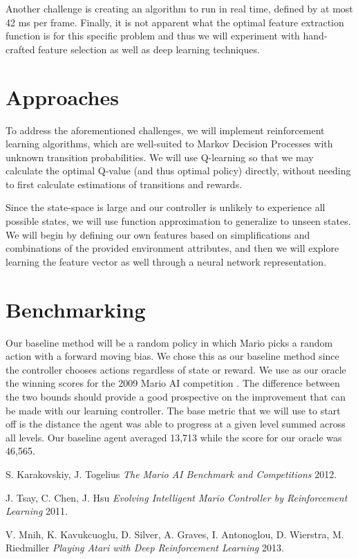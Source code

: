 \documentclass[12pt]{article}
\begin{document}
Another challenge is creating an algorithm to run in real time, defined by at most 42 ms per frame. Finally, it is not apparent what the optimal feature extraction function is for this specific problem and thus we will experiment with hand-crafted feature selection as well as deep learning techniques.

\section{Approaches}

To address the aforementioned challenges, we will implement reinforcement learning algorithms, which are well-suited to Markov Decision Processes with unknown transition probabilities. We will use Q-learning so that we may calculate the optimal Q-value (and thus optimal policy) directly, without needing to first calculate estimations of transitions and rewards. 

Since the state-space is large and our controller is unlikely to experience all possible states, we will use function approximation to generalize to unseen states. We will begin by defining our own features based on simplifications and combinations of the provided environment attributes, and then we will explore learning the feature vector as well through a neural network representation.

\section{Benchmarking}

Our baseline method will be a random policy in which Mario picks a random action with a forward moving bias. We chose this as our baseline method since the controller chooses actions regardless of state or reward. We use as our oracle the winning scores for the 2009 Mario AI competition \cite{karakovskiy}. The difference between the two bounds should provide a good prospective on the improvement that can be made with our learning controller. The base metric that we will use to start off is the distance the agent was able to progress at a given level summed across all levels. Our baseline agent averaged 13,713 while the score for our oracle was 46,565.


\begin{thebibliography}{1}

 S. Karakovskiy, J. Togelius {\em The Mario AI Benchmark and Competitions} 2012.

  J. Tsay, C. Chen, J. Hsu {\em Evolving Intelligent Mario Controller by Reinforcement Learning} 2011.

 V. Mnih, K. Kavukcuoglu, D. Silver, A. Graves, I. Antonoglou, D. Wierstra, M. Riedmiller {\em Playing Atari with Deep Reinforcement Learning} 2013.

\end{thebibliography}
\end{document}
